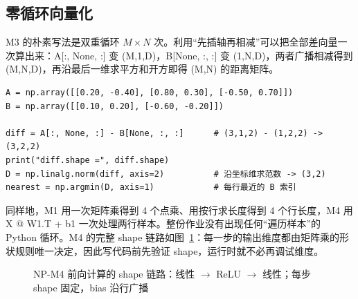 \documentclass[a4paper,12pt]{article}
\newcommand{\code}[1]{{\ttfamily\footnotesize #1}}
\begin{document}
\subsection{零循环向量化}

M3 的朴素写法是双重循环 $M\times N$ 次。利用“先插轴再相减”可以把全部差向量一次算出来：\code{A[:, None, :]} 变 \code{(M,1,D)}，\code{B[None, :, :]} 变 \code{(1,N,D)}，两者广播相减得到 \code{(M,N,D)}，再沿最后一维求平方和开方即得 \code{(M,N)} 的距离矩阵。

\begin{lstlisting}[caption={NP-M3：用广播代替双重循环（\code{numpy\_homework.py} 原样片段）}, label={lst:m3}]
A = np.array([[0.20, -0.40], [0.80, 0.30], [-0.50, 0.70]])
B = np.array([[0.10, 0.20], [-0.60, -0.20]])

diff = A[:, None, :] - B[None, :, :]      # (3,1,2) - (1,2,2) -> (3,2,2)
print("diff.shape =", diff.shape)
D = np.linalg.norm(diff, axis=2)          # 沿坐标维求范数 -> (3,2)
nearest = np.argmin(D, axis=1)            # 每行最近的 B 索引
\end{lstlisting}

同样地，M1 用一次矩阵乘得到 4 个点乘、用按行求长度得到 4 个行长度，M4 用 \code{X @ W1.T + b1} 一次处理两行样本。整份作业没有出现任何“遍历样本”的 Python 循环。M4 的完整 shape 链路如图~\ref{fig:forward}：每一步的输出维度都由矩阵乘的形状规则唯一决定，因此写代码前先验证 shape，运行时就不必再调试维度。

\begin{figure}[H]
\centering
{}
\caption{NP-M4 前向计算的 shape 链路：线性 $\rightarrow$ ReLU $\rightarrow$ 线性；每步 shape 固定，bias 沿行广播}
\label{fig:forward}
\end{figure}
\end{document}
